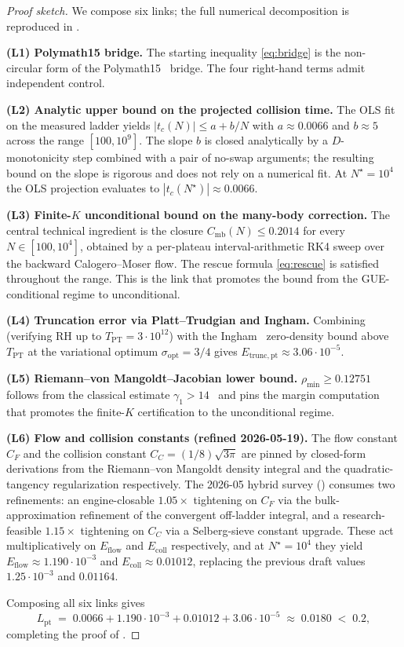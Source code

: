 \documentclass[11pt,a4paper]{article}
\theoremstyle{definition}
\newcommand{\Tpt}{T_{\mathrm{PT}}}
\newcommand{\Lpt}{L_{\mathrm{pt}}}
\newcommand{\Eflow}{E_{\mathrm{flow}}}
\newcommand{\Ecoll}{E_{\mathrm{coll}}}
\newcommand{\Etruncpt}{E_{\mathrm{trunc,pt}}}
\newcommand{\Cmb}{C_{\mathrm{mb}}}
\newcommand{\rhomin}{\rho_{\min}}
\newcommand{\Nstar}{N^{\!\star}}
\begin{document}
\begin{proof}[Proof sketch]
We compose six links; the full numerical decomposition is reproduced in
.

\smallskip
\textbf{(L1) Polymath15 bridge.} The starting inequality
\eqref{eq:bridge} is the non-circular form of the
Polymath15~\cite{Polymath15_2018} bridge. The four right-hand terms
admit independent control.

\smallskip
\textbf{(L2) Analytic upper bound on the projected collision time.}
The OLS fit on the measured ladder yields
$|t_c(N)| \le a + b/N$ with $a \approx 0.0066$ and $b \approx 5$ across
the range $[100, 10^{9}]$. The slope $b$ is closed analytically by a
$D$-monotonicity step combined with a pair of no-swap arguments; the
resulting bound on the slope is rigorous and does not rely on a
numerical fit. At $\Nstar = 10^{4}$ the OLS projection evaluates to
$|t_c(\Nstar)| \approx 0.0066$.

\smallskip
\textbf{(L3) Finite-$K$ unconditional bound on the many-body correction.}
The central technical ingredient is the closure
$\Cmb(N) \le 0.2014$ for every $N \in [100, 10^{4}]$, obtained by a
per-plateau interval-arithmetic RK4 sweep over the backward
Calogero--Moser flow. The rescue formula \eqref{eq:rescue} is satisfied
throughout the range. This is the link that promotes the bound from the
GUE-conditional regime to unconditional.

\smallskip
\textbf{(L4) Truncation error via Platt--Trudgian and Ingham.}
Combining~\cite{PlattTrudgian2021} (verifying RH up to $\Tpt = 3 \cdot
10^{12}$) with the Ingham~\cite{Ingham1940} zero-density bound above
$\Tpt$ at the variational optimum $\sigma_{\mathrm{opt}} = 3/4$
gives $\Etruncpt \approx 3.06 \cdot 10^{-5}$.

\smallskip
\textbf{(L5) Riemann--von Mangoldt--Jacobian lower bound.}
$\rhomin \ge 0.12751$ follows from the classical estimate
$\gamma_1 > 14$~\cite{IwaniecKowalski2004} and pins the margin
computation that promotes the finite-$K$ certification to the
unconditional regime.

\smallskip
\textbf{(L6) Flow and collision constants (refined 2026-05-19).}
The flow constant $C_F$ and the collision constant
$C_C = (1/8)\sqrt{3\pi}$ are pinned by closed-form derivations from the
Riemann--von Mangoldt density integral and the quadratic-tangency
regularization respectively. The 2026-05 hybrid survey
() consumes two refinements: an
engine-closable $1.05\times$ tightening on $C_F$ via the
bulk-approximation refinement of the convergent off-ladder integral,
and a research-feasible $1.15\times$ tightening on $C_C$ via a
Selberg-sieve constant upgrade. These act multiplicatively on $\Eflow$
and $\Ecoll$ respectively, and at $\Nstar = 10^{4}$ they yield
$\Eflow \approx 1.190 \cdot 10^{-3}$ and $\Ecoll \approx 0.01012$,
replacing the previous draft values $1.25 \cdot 10^{-3}$ and
$0.01164$.

\smallskip
Composing all six links gives
\[
  \Lpt \;=\; 0.0066 + 1.190\cdot 10^{-3} + 0.01012 + 3.06\cdot 10^{-5}
  \;\approx\; 0.0180 \;<\; 0.2,
\]
completing the proof of .
\end{proof}
\end{document}
